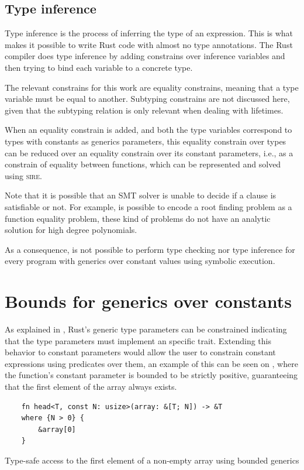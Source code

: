 \subsection{Type inference}

Type inference is the process of inferring the type of an expression. This is
what makes it possible to write Rust code with almost no type annotations. The
Rust compiler does type inference by adding constrains over inference variables
and then trying to bind each variable to a concrete type.

The relevant constrains for this work are equality constrains, meaning that a
type variable must be equal to another. Subtyping constrains are not discussed
here, given that the subtyping relation is only relevant when dealing with
lifetimes.

When an equality constrain is added, and both the type variables correspond to
types with constants as generics parameters, this equality constrain over types
can be reduced over an equality constrain over its constant parameters, i.e.,
as a constrain of equality between functions, which can be represented and
solved using \textsc{sire}. 

Note that it is possible that an SMT solver is unable to decide if a clause is
satisfiable or not. For example, is possible to encode a root finding problem
as a function equality problem, these kind of problems do not have an analytic
solution for high degree polynomials.

As a consequence, is not possible to perform type checking nor type inference
for every program with generics over constant values using symbolic execution.

\section{Bounds for generics over constants}

As explained in , Rust's generic type parameters can be
constrained indicating that the type parameters must implement an specific
trait. Extending this behavior to constant parameters would allow the user to
constrain constant expressions using predicates over them, an example of this
can be seen on , where the 
function's constant parameter  is bounded to be strictly positive,
guaranteeing that the first element of the array always exists. 

\begin{listing}[h]
	\begin{verbatim}
    fn head<T, const N: usize>(array: &[T; N]) -> &T
    where {N > 0} {
        &array[0]
    }
    \end{verbatim}
    \caption{Type-safe access to the first element of a non-empty array using bounded generics}
  \label{lst:head_const_generics}
\end{listing}

